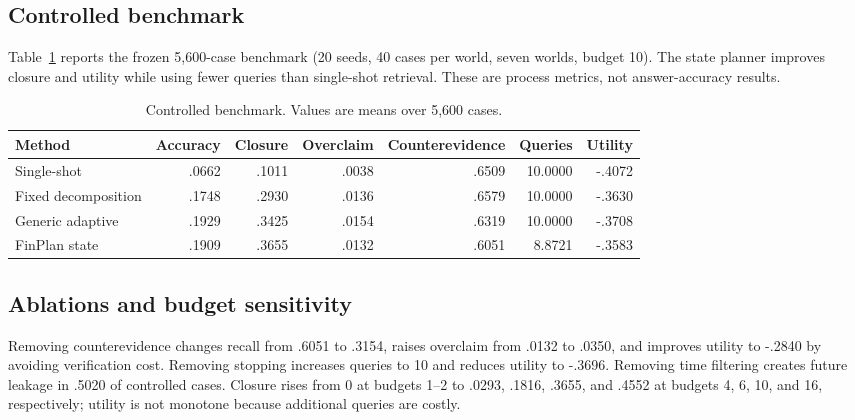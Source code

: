 \documentclass[12pt]{article}
\begin{document}
\subsection{Controlled benchmark}
Table~\ref{tab:controlled} reports the frozen 5,600-case benchmark (20 seeds, 40 cases per world, seven worlds, budget 10). The state planner improves closure and utility while using fewer queries than single-shot retrieval. These are process metrics, not answer-accuracy results.
\begin{table}[t]\centering\small
\caption{Controlled benchmark. Values are means over 5,600 cases.}
\label{tab:controlled}
\begin{tabular}{lrrrrrr}
\toprule
Method & Accuracy & Closure & Overclaim & Counterevidence & Queries & Utility\\
\midrule
Single-shot & .0662 & .1011 & .0038 & .6509 & 10.0000 & -.4072\\
Fixed decomposition & .1748 & .2930 & .0136 & .6579 & 10.0000 & -.3630\\
Generic adaptive & .1929 & .3425 & .0154 & .6319 & 10.0000 & -.3708\\
FinPlan state & .1909 & .3655 & .0132 & .6051 & 8.8721 & -.3583\\
\bottomrule
\end{tabular}
\end{table}

\subsection{Ablations and budget sensitivity}
Removing counterevidence changes recall from .6051 to .3154, raises overclaim from .0132 to .0350, and improves utility to -.2840 by avoiding verification cost. Removing stopping increases queries to 10 and reduces utility to -.3696. Removing time filtering creates future leakage in .5020 of controlled cases. Closure rises from 0 at budgets 1--2 to .0293, .1816, .3655, and .4552 at budgets 4, 6, 10, and 16, respectively; utility is not monotone because additional queries are costly.
\end{document}

